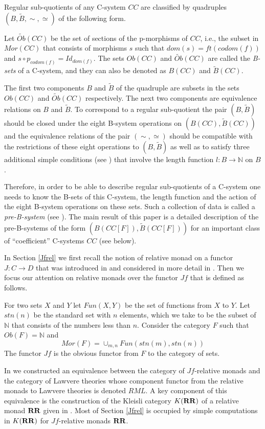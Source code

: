 \documentclass[12pt]{amsart}
\numberwithin{proposition}{subsection}
\newcommand{\sr}{\rightarrow}
\newcommand{\nn}{{\mathbb N}}
\newcommand{\nat}{\nn}
\newcommand{\wt}{\widetilde}
\newcommand{\RR}{{\bf RR}}
\begin{document}
Regular sub-quotients of any C-system $CC$ are classified by quadruples
$(B,\wt{B}, \sim,\simeq)$ of the following form.

Let $\wt{Ob}(CC)$ be the set of sections of the p-morphisms of $CC$, i.e., the
subset in $Mor(CC)$ that consists of morphisms $s$ such that
$dom(s)=ft(codom(f))$ and $s\circ p_{codom(f)}=Id_{dom(f)}$.  The sets $Ob(CC)$
and $\wt{Ob}(CC)$ are called the {\em B-sets} of a C-system, and they can also be denoted
as $B(CC)$ and $\wt{B}(CC)$.

The first two components $B$ and $\wt{B}$ of the quadruple are subsets in the
sets $Ob(CC)$ and $\wt{Ob}(CC)$ respectively. The next two components are
equivalence relations on $B$ and $\wt{B}$. To correspond to a regular
sub-quotient the pair $(B,\wt{B})$ should be closed under the eight B-system
operations on $(B(CC),\wt{B}(CC))$ and the equivalence relations of the pair
$(\sim,\simeq)$ should be compatible with the restrictions of these eight
operations to $(B,\wt{B})$ as well as to satisfy three additional simple
conditions (see \cite[Proposition 5.4]{Csubsystems}) that involve the length
function $l:B\sr\nat$ on $B$.

Therefore, in order to be able to describe regular sub-quotients of a C-system
one needs to know the B-sets of this C-system, the length function and the
action of the eight B-system operations on these sets. Such a collection of
data is called a {\em pre-B-system} (see \cite{Bsystems}). The main result of this
paper is a detailed description of the pre-B-systems of the form
$(B(CC[F]),\wt{B}(CC[F]))$ for an important class of ``coefficient''
C-systems $CC$ (see below).

In Section \ref{Jfrel} we first recall the notion of relative monad on a
functor $J:C\sr D$ that was introduced in \cite[Def.1, p.~299]{ACU} and
considered in more detail in \cite{ACU2}. Then we focus our attention on
relative monads over the functor $Jf$ that is defined as follows.

For two sets $X$ and $Y$ let $Fun(X,Y)$ be the set of functions from $X$ to
$Y$.  Let $stn(n)$ be the standard set with $n$ elements, which we take to be the
subset of $\nat$ that consists of the numbers less than $n$. Consider the category $F$ such
that $Ob(F)=\nn$ and
%
$$Mor(F)=\cup_{m,n}Fun(stn(m),stn(n))$$
%
The functor $Jf$ is the obvious functor from $F$ to the category of sets. 

In \cite{LandJf} we constructed an equivalence between the category of
$Jf$-relative monads and the category of Lawvere theories whose component
functor from the relative monads to Lawvere theories is denoted $RML$. A key
component of this equivalence is the construction of the Kleisli category
$K(\RR)$ of a relative monad $\RR$ given in \cite{ACU2}.  Most of Section
\ref{Jfrel} is occupied by simple computations in $K(\RR)$ for $Jf$-relative
monads $\RR$.
\end{document}
